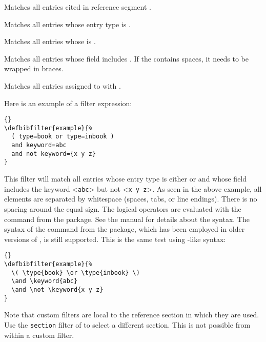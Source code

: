 \documentclass{ltxdockit}[2011/03/25]
\begin{document}
\begin{optionlist*}


Matches all entries cited in reference segment .


Matches all entries whose entry type is .


Matches all entries whose  is .


Matches all entries whose  field includes . If the  contains spaces, it needs to be wrapped in braces.


Matches all entries assigned to  with .

\end{optionlist*}

Here is an example of a filter expression:

\begin{lstlisting}[style=latex,keywords={and,or,not,type,keyword}]{}
\defbibfilter{example}{%
  ( type=book or type=inbook )
  and keyword=abc
  and not keyword={x y z}
}
\end{lstlisting}
%
This filter will match all entries whose entry type is either  or  and whose  field includes the keyword <\texttt{abc}> but not <\texttt{x y z}>. As seen in the above example, all elements are separated by whitespace (spaces, tabs, or line endings). There is no spacing around the equal sign. The logical operators are evaluated with the  command from the  package. See the  manual for details about the syntax. The syntax of the  command from the  package, which has been employed in older versions of , is still supported. This is the same test using -like syntax:

\begin{lstlisting}[style=ifthen,morekeywords={\\type,\\keyword}]{}
\defbibfilter{example}{%
  \( \type{book} \or \type{inbook} \)
  \and \keyword{abc}
  \and \not \keyword{x y z}
}
\end{lstlisting}
%
Note that custom filters are local to the reference section in which they are used. Use the \texttt{section} filter of  to select a different section. This is not possible from within a custom filter.
\end{document}
